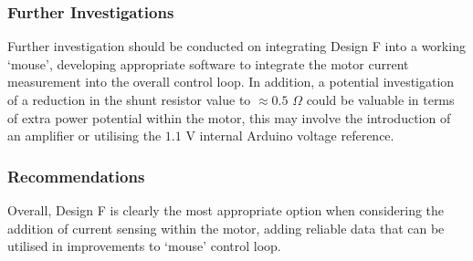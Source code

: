 \subsubsection{Further Investigations}
Further investigation should be conducted on integrating Design F into a working `mouse', developing appropriate software to integrate the motor current measurement into the overall control loop. In addition, a potential investigation of a reduction in the shunt resistor value to \(\approx0.5\) \(\Omega\) could be valuable in terms of extra power potential within the motor, this may involve the introduction of an amplifier or utilising the \(1.1\) V internal Arduino \cite{Microchip_ATmega4809, Arduino_Every} voltage reference.

\subsubsection{Recommendations}
Overall, Design F is clearly the most appropriate option when considering the addition of current sensing within the motor, adding reliable data that can be utilised in improvements to `mouse' control loop.